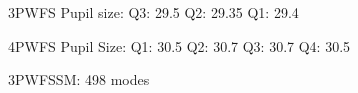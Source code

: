 






3PWFS Pupil size:
Q3: 29.5
Q2: 29.35
Q1: 29.4

4PWFS Pupil Size:
Q1: 30.5
Q2: 30.7
Q3: 30.7
Q4: 30.5

3PWFSSM: 498 modes